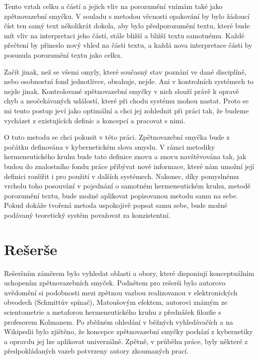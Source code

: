 \documentclass[11pt,a4paper]{article}
\begin{document}
Tento vztah celku a částí a jejich vliv na porozumění vnímám také jako zpětnovazební smyčku. V souladu s metodou věcnosti opakování by bylo žádoucí číst ten samý text několikrát dokola, aby bylo předporozumění textu, které bude mít vliv na interpretaci jeho částí, stále bližší a bližší textu samotnému. Každé přečtení by přineslo nový vhled na části textu, a každá nova interpretace části by posunula porozumění textu jako celku. 

Začít jinak, než se všemi omyly, které současný stav poznání ve dané disciplíně, nebo osobnostní fond jednotlivce, obsahuje, nejde. Ani v  kontrolních systémech to nejde jinak. Kontrolované zpětnovazební smyčky v nich slouží právě k opravě chyb a neočekávaných událostí, které při chodu systému mohou nastat. Proto se mi tento postup jeví jako optimální a chci jej zohlednit při práci tak, že budeme vycházet z existujících definic a koncepcí a pracovat s nimi.

O tuto metodu se chci pokusit v této práci. Zpětnovazební smyčka bude z počátku definována v kybernetickém slova smyslu. V rámci metodiky hermeneutického kruhu bude tato definice znovu a znovu navštěvována tak, jak budou do znalostního fondu práce přibývat nové informace, které nám umožní její definici rozšířit i pro použití v dalších systémech. Nakonec, díky pomyslnému vrcholu toho posouvání v pojednání o samotném hermeneutickém kruhu, metodě porozumění textu, bude možné aplikovat popisovanou metodu samu na sebe. Pokud dokáže tvořená metoda uspokojivě popsat samu sebe, bude možné podávaný teoretický systém považovat za konzistentní. 

\pagebreak


\section*{Rešerše}

Rešeršním záměrem bylo vyhledat oblasti a obory, které disponiují konceptuálním uchopením zpětnovazebních smyček. Podnětem pro rešerši bylo autorovo uvědomění si podobnosti mezi zpětnou vazbou realizovanou v elektronických obvodech (Schmittův spínač), Matoušovým efektem, autorovi známým ze scientometrie a metaforou hermeneutického kruhu z přednášek filozfie s profesorem Kolmanem.
Po zběžném ohledání v běžných vyhledávačích a na Wikipedii bylo zjištěno, že koncepce zpětnovazební smyčky pochází z kybernetiky a opravdu jej lze aplikovat univerzálně. Zpětně, v průběhu práce, byly některé z předpokládaných vazeb potvrzeny autory zkoumaných prací.
\end{document}
